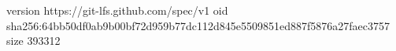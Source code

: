 version https://git-lfs.github.com/spec/v1
oid sha256:64bb50df0ab9b00bf72d959b77dc112d845e5509851ed887f5876a27faec3757
size 393312
